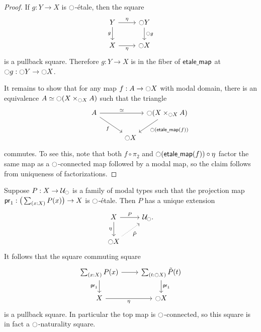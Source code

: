 \begin{proof}
If $g:Y\to X$ is ${\ocircle}$-\'etale, then the square
\begin{equation*}
\begin{tikzcd}
Y \arrow[d,swap,"g"] \arrow[r,"\modalunit"] & \modal Y \arrow[d,"\modal g"] \\
X \arrow[r,swap,"\modalunit"] & \modal X
\end{tikzcd}
\end{equation*}
is a pullback square. Therefore $g:Y\to X$ is in the fiber of $\mathsf{etale\underline{\ }{}map}$ at ${\ocircle} g : {\ocircle} Y\to{\ensuremath{\ocircle}} X$. 

It remains to show that for any map $f:A\to{\ensuremath{\ocircle}} X$ with modal domain, there is an equivalence $\eqv{A}{\modal (X\times_{\modal X} A)}$ such that the triangle
\begin{equation*}
\begin{tikzcd}[column sep=tiny]
A \arrow[dr,swap,"f"] \arrow[rr,"\eqvsym"] & & \modal (X\times_{\modal X} A) \arrow[dl,"\modal(\etmap(f))"] \\
\phantom{\modal (X\times_{\modal X} A)} & \modal X
\end{tikzcd}
\end{equation*}
commutes. To see this, note that both $f\circ \pi_2$ and ${\ocircle}(\mathsf{etale\underline{\ }{}map}(f))\circ {\eta_{}}$ factor the same map as a ${\ocircle}$-connected map followed by a modal map, so the claim follows from uniqueness of factorizations.
\end{proof}

\begin{cor}
Suppose $P:X\to\mathcal{U}_{\ocircle}$ is a family of modal types such that the projection map $\proj 1:\big(\sm{x:X}P(x)\big)\to X$ is ${\ocircle}$-\'etale. Then $P$ has a unique extension
\begin{equation*}
\begin{tikzcd}
X \arrow[d,swap,"\modalunit"] \arrow[r,"P"] & \UU_\modal. \\
\modal X \arrow[ur,densely dotted,swap,"\tilde{P}"] 
\end{tikzcd}
\end{equation*}
It follows that the square commuting square
\begin{equation*}
\begin{tikzcd}
\sm{x:X}P(x) \arrow[d,swap,"\proj 1"] \arrow[r] & \sm{t:\modal X}\tilde{P}(t) \arrow[d,"\proj 1"] \\
X \arrow[r,swap,"\modalunit"] & \modal X
\end{tikzcd}
\end{equation*}
is a pullback square. In particular the top map is ${\ocircle}$-connected, so this square is in fact a ${\ocircle}$-naturality square.
\end{cor}

